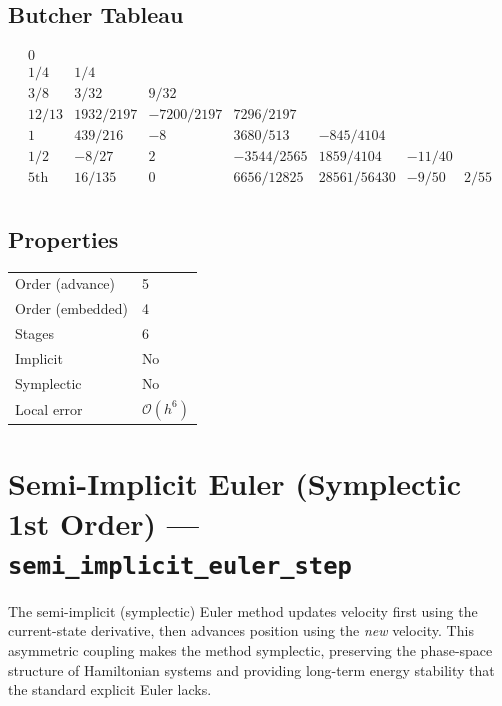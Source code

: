 \documentclass[11pt,a4paper]{article}
\newcommand{\bigO}{\mathcal{O}}
\begin{document}
\subsection{Butcher Tableau}
\[
\renewcommand{\arraystretch}{1.3}
\begin{array}{c|cccccc}
  0      &            &          &              &            &        &      \\
  1/4    & 1/4        &          &              &            &        &      \\
  3/8    & 3/32       & 9/32     &              &            &        &      \\
  12/13  & 1932/2197  & -7200/2197 & 7296/2197  &            &        &      \\
  1      & 439/216    & -8       & 3680/513     & -845/4104  &        &      \\
  1/2    & -8/27      & 2        & -3544/2565   & 1859/4104  & -11/40 &      \\
  \hline
  \text{5th} & 16/135 & 0        & 6656/12825   & 28561/56430 & -9/50 & 2/55 \\
\end{array}
\]

\subsection{Properties}
\begin{center}
\begin{tabular}{ll}
  \hline
  Order (advance)  & 5 \\
  Order (embedded) & 4 \\
  Stages           & 6 \\
  Implicit         & No \\
  Symplectic       & No \\
  Local error      & $\bigO(h^6)$ \\
  \hline
\end{tabular}
\end{center}

\section{Semi-Implicit Euler (Symplectic 1st Order) --- \texttt{semi\_implicit\_euler\_step}}
\label{sec:euler}

The semi-implicit (symplectic) Euler method updates velocity first using the
current-state derivative, then advances position using the \emph{new} velocity.
This asymmetric coupling makes the method symplectic, preserving the phase-space
structure of Hamiltonian systems and providing long-term energy stability that
the standard explicit Euler lacks.
\end{document}
